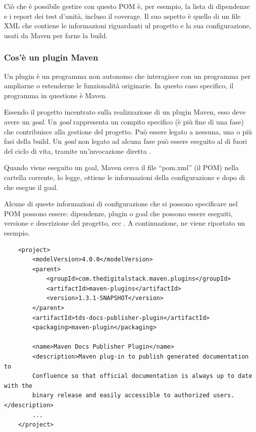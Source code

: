 
    Ciò che è possibile gestire con questo POM è, per esempio, la lista di dipendenze e i report dei test d'unità, incluso il coverage.
    Il suo aspetto è quello di un file XML che contiene le informazioni riguardanti ul progetto e la sua configurazione, usati da Maven per farne la build.

    \subsubsection{Cos'è un plugin Maven}

    Un plugin è un programma non autonomo che interagisce con un programma per ampliarne o estenderne le funzionalità originarie.
    In questo caso specifico, il programma in questione è Maven.

    Essendo il progetto incentrato sulla realizzazione di un plugin Maven, esso deve avere un \emph{goal}.
    Un \emph{goal} rappresenta un compito specifico (è più fine di una fase) che contribuisce alla gestione del progetto.
    Può essere legato a nessuna, una o più fasi della build.
    Un \emph{goal} non legato ad alcuna fase può essere eseguito al di fuori del ciclo di vita, tramite un'invocazione diretta \cite{site:maven-plugin}.


    Quando viene eseguito un goal, Maven cerca il file ``pom.xml'' (il POM) nella cartella corrente, lo legge, ottiene le informazioni della configurazione e dopo di che esegue il goal.

    Alcune di queste informazioni di configurazione che si possono specificare nel POM possono essere: dipendenze, plugin o goal che possono essere eseguiti, versione e descrizione del progetto, ecc \cite{site:maven-pom}.
    A continuazione, ne viene riportato un esempio.


    \begin{lstlisting} 
    <project>
        <modelVersion>4.0.0</modelVersion>
        <parent>
            <groupId>com.thedigitalstack.maven.plugins</groupId>
            <artifactId>maven-plugins</artifactId>
            <version>1.3.1-SNAPSHOT</version>
        </parent>
        <artifactId>tds-docs-publisher-plugin</artifactId>
        <packaging>maven-plugin</packaging>

        <name>Maven Docs Publisher Plugin</name>
        <description>Maven plug-in to publish generated documentation to 
        Confluence so that official documentation is always up to date with the 
        binary release and easily accessible to authorized users.</description>
        ...
    </project>  
    \end{lstlisting}
    
